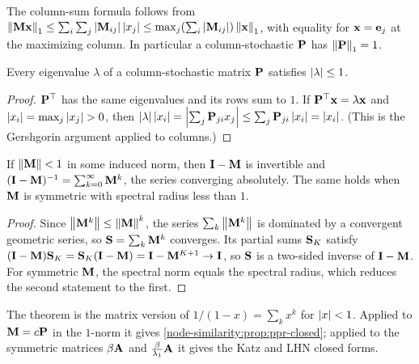 \begin{notechapter}
The column-sum formula follows from $\left\|\mathbf{M}\mathbf{x}\right\|_1 \le \sum_i\sum_j\left|\mathbf{M}_{ij}\right|\left|x_j\right| \le \max_j(\sum_i\left|\mathbf{M}_{ij}\right|)\left\|\mathbf{x}\right\|_1$, with equality for $\mathbf{x} = \mathbf{e}_j$ at the maximizing column. In particular a column-stochastic $\mathbf{P}$ has $\left\|\mathbf{P}\right\|_1 = 1$.

\begin{proposition}\label{node-similarity:prop:eigenvalue-bound}
Every eigenvalue $\lambda$ of a column-stochastic matrix $\mathbf{P}$ satisfies $\left|\lambda\right| \le 1$.
\end{proposition}

\begin{proof}
$\mathbf{P}^\top$ has the same eigenvalues and its rows sum to $1$. If $\mathbf{P}^\top\mathbf{x} = \lambda\mathbf{x}$ and $\left|x_i\right| = \max_j\left|x_j\right| > 0$, then $\left|\lambda\right|\left|x_i\right| = \left|\sum_j\mathbf{P}_{ji}x_j\right| \le \sum_j\mathbf{P}_{ji}\left|x_i\right| = \left|x_i\right|$. (This is the Gershgorin argument applied to columns.)
\end{proof}

\begin{theorem}\label{node-similarity:thm:neumann}
If $\left\|\mathbf{M}\right\| < 1$ in some induced norm, then $\mathbf{I} - \mathbf{M}$ is invertible and $(\mathbf{I} - \mathbf{M})^{-1} = \sum_{k=0}^\infty\mathbf{M}^k$, the series converging absolutely. The same holds when $\mathbf{M}$ is symmetric with spectral radius less than $1$.
\end{theorem}

\begin{proof}
Since $\left\|\mathbf{M}^k\right\| \le \left\|\mathbf{M}\right\|^k$, the series $\sum_k\left\|\mathbf{M}^k\right\|$ is dominated by a convergent geometric series, so $\mathbf{S} = \sum_k\mathbf{M}^k$ converges. Its partial sums $\mathbf{S}_K$ satisfy $(\mathbf{I} - \mathbf{M})\mathbf{S}_K = \mathbf{S}_K(\mathbf{I} - \mathbf{M}) = \mathbf{I} - \mathbf{M}^{K+1} \to \mathbf{I}$, so $\mathbf{S}$ is a two-sided inverse of $\mathbf{I} - \mathbf{M}$. For symmetric $\mathbf{M}$, the spectral norm equals the spectral radius, which reduces the second statement to the first.
\end{proof}

The theorem is the matrix version of $1/(1-x) = \sum_kx^k$ for $\left|x\right| < 1$. Applied to $\mathbf{M} = c\mathbf{P}$ in the $1$-norm it gives \cref{node-similarity:prop:ppr-closed}; applied to the symmetric matrices $\beta\mathbf{A}$ and $\frac{\beta}{\lambda_1}\mathbf{A}$ it gives the Katz and LHN closed forms.


\end{notechapter}
